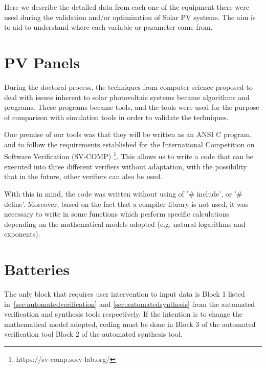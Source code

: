 Here we describe the detailed data from each one of the equipment there were used during the validation and/or optimization of Solar PV systems. The aim is to aid to understand where each variable or parameter came from.

\section{PV Panels}

During the doctoral process, the techniques from computer science proposed to deal with issues inherent to solar photovoltaic systems became algorithms and programs. These programs became tools, and the tools were used for the purpose of comparison with simulation tools in order to validate the techniques.

One premise of our tools was that they will be written as an ANSI C program, and to follow the requirements established for the International Competition on Software Verification (SV-COMP) \footnote{https://sv-comp.sosy-lab.org/}. This allows us to write a code that can be executed into three different verifiers without adaptation, with the possibility that in the future, other verifiers can also be used.
%

With this in mind, the code was written without using of '\# include', or '\# define'. Moreover, based on the fact that a compiler library is not used, it was necessary to write in some functions which perform specific calculations depending on the mathematical models adopted (e.g. natural logarithms and exponents).


\section{Batteries}

The only block that requires user intervention to input data is Block 1 listed in~\ref{sec:automatedverification} and \ref{sec:automatedsynthesis} from the automated verification and synthesis tools respectively. If the intention is to change the mathematical model adopted, coding must be done in Block 3 of the automated verification tool Block 2 of the automated synthesis tool.

